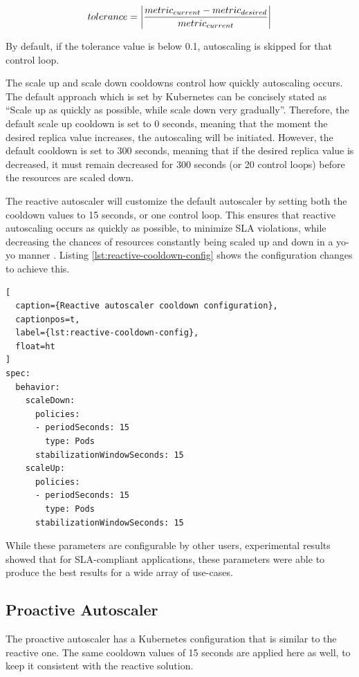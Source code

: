 \[ tolerance = \abs{ \frac{metric_{current} - metric_{desired}}{metric_{current}} }\]

By default, if the tolerance value is below 0.1, autoscaling is skipped for that control loop.\par

The scale up and scale down cooldowns control how quickly autoscaling occurs. The default approach which is set by Kubernetes can be concisely stated as ``Scale up as quickly as possible, while scale down very gradually''. Therefore, the default scale up cooldown is set to 0 seconds, meaning that the moment the desired replica value increases, the autoscaling will be initiated. However, the default cooldown is set to 300 seconds, meaning that if the desired replica value is decreased, it must remain decreased for 300 seconds (or 20 control loops) before the resources are scaled down.\par

The reactive autoscaler will customize the default autoscaler by setting both the cooldown values to 15 seconds, or one control loop. This ensures that reactive autoscaling occurs as quickly as possible, to minimize SLA violations, while decreasing the chances of resources constantly being scaled up and down in a yo-yo manner \cite{sides2015yo}. Listing \ref{lst:reactive-cooldown-config} shows the configuration changes to achieve this.\par

\begin{lstlisting}[
  caption={Reactive autoscaler cooldown configuration},
  captionpos=t,
  label={lst:reactive-cooldown-config},
  float=ht
]
spec:
  behavior:
    scaleDown:
      policies:
      - periodSeconds: 15
        type: Pods
      stabilizationWindowSeconds: 15
    scaleUp:
      policies:
      - periodSeconds: 15
        type: Pods
      stabilizationWindowSeconds: 15
\end{lstlisting}

While these parameters are configurable by other users, experimental results showed that for SLA-compliant applications, these parameters were able to produce the best results for a wide array of use-cases.

\subsection{Proactive Autoscaler}
\label{subsec:proactive-auto-subsection}

The proactive autoscaler has a Kubernetes configuration that is similar to the reactive one. The same cooldown values of 15 seconds are applied here as well, to keep it consistent with the reactive solution.\par

